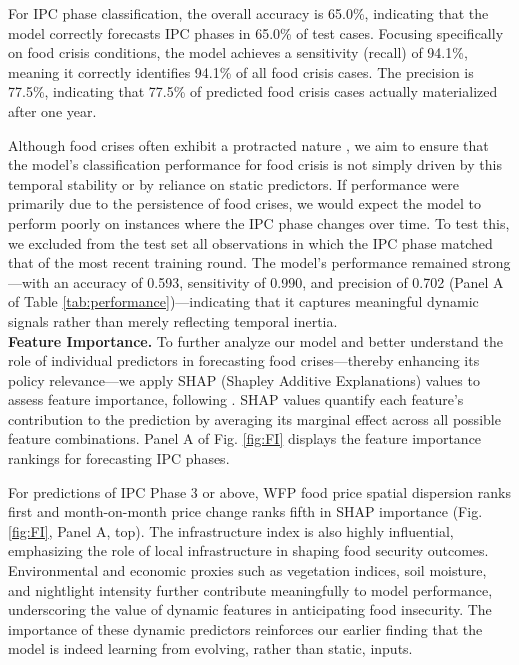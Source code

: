 \documentclass[pdflatex,sn-mathphys-num]{sn-jnl}%
\theoremstyle{thmstyleone}%
\theoremstyle{thmstyletwo}%
\theoremstyle{thmstylethree}%
\begin{document}
For IPC phase classification, the overall accuracy is 65.0\%, indicating that the model correctly forecasts IPC phases in 65.0\% of test cases. Focusing specifically on food crisis conditions, the model achieves a sensitivity (recall) of 94.1\%, meaning it correctly identifies 94.1\% of all food crisis cases. The precision is 77.5\%, indicating that 77.5\% of predicted food crisis cases actually materialized after one year.

Although food crises often exhibit a protracted nature \citep{FSIN2025}, we aim to ensure that the model’s classification performance for food crisis is not simply driven by this temporal stability or by reliance on static predictors. If performance were primarily due to the persistence of food crises, we would expect the model to perform poorly on instances where the IPC phase changes over time. To test this, we excluded from the test set all observations in which the IPC phase matched that of the most recent training round. The model’s performance remained strong—with an accuracy of 0.593, sensitivity of 0.990, and precision of 0.702 (Panel A of Table \ref{tab:performance})—indicating that it captures meaningful dynamic signals rather than merely reflecting temporal inertia. \\

\noindent\textbf{Feature Importance.}
To further analyze our model and better understand the role of individual predictors in forecasting food crises—thereby enhancing its policy relevance—we apply SHAP (Shapley Additive Explanations) values to assess feature importance, following  \cite{marcilio2020explanations}. SHAP values quantify each feature’s contribution to the prediction by averaging its marginal effect across all possible feature combinations. Panel A of Fig. \ref{fig:FI} displays the feature importance rankings for forecasting IPC phases.

For predictions of IPC Phase 3 or above, WFP food price spatial dispersion ranks first and month-on-month price change ranks fifth in SHAP importance (Fig. \ref{fig:FI}, Panel A, top). The infrastructure index is also highly influential, emphasizing the role of local infrastructure in shaping food security outcomes. Environmental and economic proxies such as vegetation indices, soil moisture, and nightlight intensity further contribute meaningfully to model performance, underscoring the value of dynamic features in anticipating food insecurity. The importance of these dynamic predictors reinforces our earlier finding that the model is indeed learning from evolving, rather than static, inputs.
\end{document}
